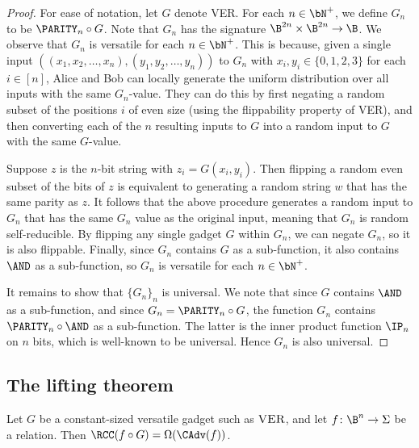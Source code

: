 \begin{proof}
For ease of notation, let $G$ denote \textsc{VER}.
For each $n\in\bN^+$, we define $G_{n}$ to be
$\PARITY_n\circ G$. Note that $G_{n}$ has the signature
$\B^{2n}\times\B^{2n}\to\B$. We observe that $G_{n}$
is versatile for each $n\in\bN^{+}$. This is because,
given a single input $((x_1,x_2,\dots,x_n),(y_1,y_2,\dots,y_n))$
to $G_{n}$ with $x_i,y_i\in\{0,1,2,3\}$ for each $i\in[n]$,
Alice and Bob can locally generate the uniform
distribution over all inputs with the same $G_{n}$-value.
They can do this by first negating a random subset of the
positions $i$ of even size
(using the flippability property of \textsc{VER}),
and then converting each of the $n$ resulting inputs to $G$
into a random input to $G$ with the same $G$-value.

Suppose $z$ is the $n$-bit string with $z_i=G(x_i,y_i)$.
Then flipping a random even subset of the bits of $z$
is equivalent to generating a random string $w$ that has
the same parity as $z$. It follows that the above procedure
generates a random input to $G_{n}$ that has the same $G_{n}$
value as the original input, meaning that $G_{n}$
is random self-reducible. By flipping any single gadget
$G$ within $G_{n}$, we can negate $G_n$, so it is also
flippable. Finally, since $G_n$ contains $G$ as a sub-function,
it also contains $\AND$ as a sub-function, so $G_n$
is versatile for each $n\in\bN^{+}$.

It remains to show that $\{G_n\}_n$ is universal.
We note that since $G$ contains $\AND$ as a sub-function,
and since $G_n=\PARITY_n\circ G$, the function $G_n$
contains $\PARITY_n\circ\AND$ as a sub-function. The latter
is the inner product function $\IP_n$ on $n$ bits,
which is well-known to be universal. Hence $G_n$ is also
universal.
\end{proof}


\subsection{The lifting theorem}

\begin{theorem}
Let $G$ be a constant-sized versatile gadget such as
$\textsc{VER}$, and let $f\colon\B^n\to\Sigma$ be a relation.
Then $\RCC(f\circ G) =\Omega(\CAdv(f))$.
\end{theorem}

